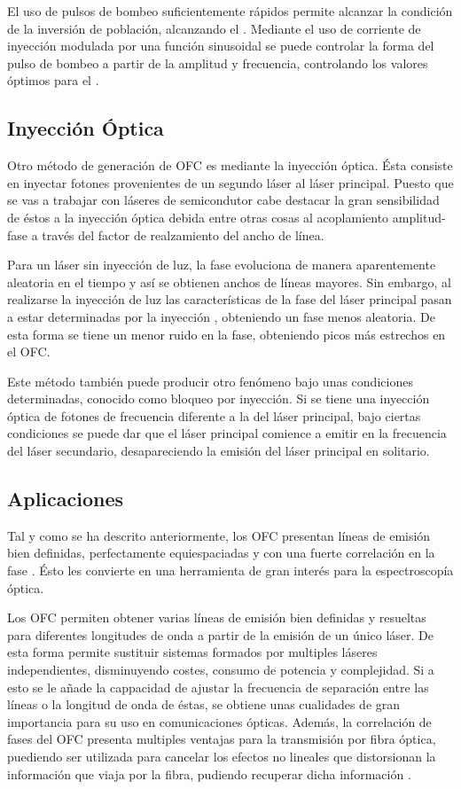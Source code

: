 		El uso de pulsos de bombeo suficientemente r\'apidos permite alcanzar la condici\'on de la inversi\'on de poblaci\'on, alcanzando el \gs. Mediante el uso de corriente de inyecci\'on modulada por una funci\'on sinusoidal se puede controlar la forma del pulso de bombeo a partir de la amplitud y frecuencia, controlando los valores \'optimos para el \gs.

	\subsection{Inyección Óptica}

		Otro m\'etodo de generaci\'on de OFC es mediante la inyecci\'on \'optica. \'Esta consiste en inyectar fotones provenientes de un segundo l\'aser al l\'aser principal. Puesto que se vas a trabajar con l\'aseres de semicondutor cabe destacar la gran sensibilidad de \'estos a la inyecci\'on \'optica debida entre otras cosas al acoplamiento amplitud-fase a trav\'es del factor de realzamiento del ancho de l\'inea.

		Para un l\'aser sin inyecci\'on de luz, la fase evoluciona de manera aparentemente aleatoria en el tiempo y as\'i se obtienen anchos de l\'ineas mayores. Sin embargo, al realizarse la inyecci\'on de luz las caracter\'isticas de la fase del l\'aser principal pasan a estar determinadas por la inyecci\'on , obteniendo un fase menos aleatoria. De esta forma se tiene un menor ruido en la fase, obteniendo picos m\'as estrechos en el OFC.

		Este m\'etodo tambi\'en puede producir otro fen\'omeno bajo unas condiciones determinadas, conocido como bloqueo por inyecci\'on. Si se tiene una inyecci\'on \'optica de fotones de frecuencia diferente a la del l\'aser principal, bajo ciertas condiciones se puede dar que el l\'aser principal comience a emitir en la frecuencia del l\'aser secundario, desapareciendo la emisi\'on del l\'aser principal en solitario.

	\subsection{Aplicaciones}

		Tal y como se ha descrito anteriormente, los OFC presentan l\'ineas de emisi\'on bien definidas, perfectamente equiespaciadas y con una fuerte correlaci\'on en la fase \cite{tesis}. \'Esto les convierte en una herramienta de gran inter\'es para la espectroscop\'ia \'optica.

		Los OFC permiten obtener varias l\'ineas de emisi\'on bien definidas y resueltas para diferentes longitudes de onda a partir de la emisi\'on de un \'unico l\'aser. De esta forma permite sustituir sistemas formados por multiples l\'aseres independientes, disminuyendo costes, consumo de potencia y complejidad. Si a esto se le añade la cappacidad de ajustar la frecuencia de separación entre las líneas o la longitud de onda de éstas, se obtiene unas cualidades de gran importancia para su uso en comunicaciones \'opticas. Además, la correlación de fases del OFC presenta multiples ventajas para la transmisión por fibra óptica, puediendo ser utilizada para cancelar los efectos no lineales que distorsionan la información que viaja por la fibra, pudiendo recuperar dicha información \cite{temprana2015overcoming}.
